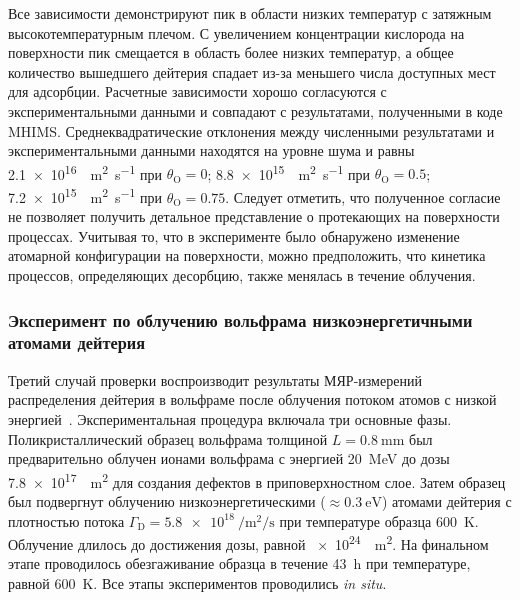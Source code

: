 Все зависимости демонстрируют пик в области низких температур с затяжным высокотемпературным плечом. С увеличением концентрации кислорода на поверхности пик смещается в область более низких температур, а общее количество вышедшего дейтерия спадает из-за меньшего числа доступных мест для адсорбции. Расчетные зависимости хорошо согласуются с экспериментальными данными и совпадают с результатами, полученными в коде MHIMS. Среднеквадратические отклонения между численными результатами и экспериментальными данными находятся на уровне шума и равны \SI{2.1e16}{\per\meter\squared\per\second} при \( \theta_\mathrm{O}=\num{0} \); \SI{8.8e15}{\per\meter\squared\per\second} при \( \theta_\mathrm{O}=\num{0,5} \); \SI{7.2e15}{\per\meter\squared\per\second} при \( \theta_\mathrm{O}=\num{0,75} \). Следует отметить, что полученное согласие не позволяет получить детальное представление о протекающих на поверхности процессах. Учитывая то, что в эксперименте было обнаружено изменение атомарной конфигурации на поверхности, можно предположить, что кинетика процессов, определяющих десорбцию, также менялась в течение облучения.

\subsubsection{Эксперимент по облучению вольфрама низкоэнергетичными атомами дейтерия}
Третий случай проверки воспроизводит результаты МЯР-измерений распределения дейтерия в вольфраме после облучения потоком атомов с низкой энергией~\cite{Markelj2016}. Экспериментальная процедура включала три основные фазы. Поликристаллический образец вольфрама толщиной \(L=\SI{0.8}{\milli\meter}\) был предварительно облучен ионами вольфрама с энергией \SI{20}{\mega\electronvolt} до дозы \SI{7.8e17}{\per\meter\squared} для создания дефектов в приповерхностном слое. Затем образец был подвергнут облучению низкоэнергетическими (\(\approx\SI{0.3}{\electronvolt}\)) атомами дейтерия с плотностью потока \(\Gamma_\mathrm{D}=\SI{5.8e18}{\per\meter\squared\per\second}\) при температуре образца \SI{600}{\kelvin}. Облучение длилось до достижения дозы, равной \SI{e24}{\per\meter\squared}. На финальном этапе проводилось обезгаживание образца в течение \SI{43}{\hour} при температуре, равной \SI{600}{\kelvin}. Все этапы экспериментов проводились \textit{in situ}.

